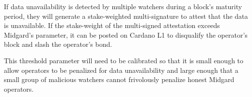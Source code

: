 \documentclass[../midgard.tex]{subfiles}
\begin{document}
If data unavailability is detected by multiple watchers during a block's maturity period, they will generate a stake-weighted multi-signature to attest that the data is unavailable.
If the stake-weight of the multi-signed attestation exceeds Midgard's  parameter, it can be posted on Cardano L1 to disqualify the operator's block and slash the operator's bond.

This threshold parameter will need to be calibrated so that it is small enough to allow operators to be penalized for data unavailability and large enough that a small group of malicious watchers cannot frivolously penalize honest Midgard operators.
\end{document}
